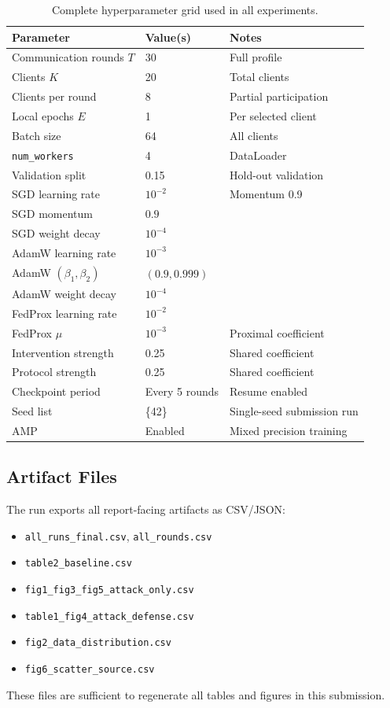 ﻿\documentclass{article}
\begin{document}
\begin{table}[ht!]
  \caption{Complete hyperparameter grid used in all experiments.}
  \label{tab:hparams}
  \centering
  \small
  \begin{tabular}{lll}
    \toprule
    \textbf{Parameter} & \textbf{Value(s)} & \textbf{Notes} \\
    \midrule
    Communication rounds $T$ & 30 & Full profile \\
    Clients $K$ & 20 & Total clients \\
    Clients per round & 8 & Partial participation \\
    Local epochs $E$ & 1 & Per selected client \\
    Batch size & 64 & All clients \\
    \texttt{num\_workers} & 4 & DataLoader \\
    Validation split & 0.15 & Hold-out validation \\
    \midrule
    SGD learning rate & $10^{-2}$ & Momentum 0.9 \\
    SGD momentum & $0.9$ & \\
    SGD weight decay & $10^{-4}$ & \\
    AdamW learning rate & $10^{-3}$ & \\
    AdamW $(\beta_1, \beta_2)$ & $(0.9, 0.999)$ & \\
    AdamW weight decay & $10^{-4}$ & \\
    FedProx learning rate & $10^{-2}$ & \\
    FedProx $\mu$ & $10^{-3}$ & Proximal coefficient \\
    \midrule
    Intervention strength & 0.25 & Shared coefficient \\
    Protocol strength & 0.25 & Shared coefficient \\
    Checkpoint period & Every 5 rounds & Resume enabled \\
    Seed list & \{42\} & Single-seed submission run \\
    AMP & Enabled & Mixed precision training \\
    \bottomrule
  \end{tabular}
\end{table}

\subsection{Artifact Files}

The run exports all report-facing artifacts as CSV/JSON:
\begin{itemize}[leftmargin=1.25em,itemsep=0pt]
  \item \texttt{all\_runs\_final.csv}, \texttt{all\_rounds.csv}
  \item \texttt{table2\_baseline.csv}
  \item \texttt{fig1\_fig3\_fig5\_attack\_only.csv}
  \item \texttt{table1\_fig4\_attack\_defense.csv}
  \item \texttt{fig2\_data\_distribution.csv}
  \item \texttt{fig6\_scatter\_source.csv}
\end{itemize}
These files are sufficient to regenerate all tables and figures in this submission.
\end{document}
